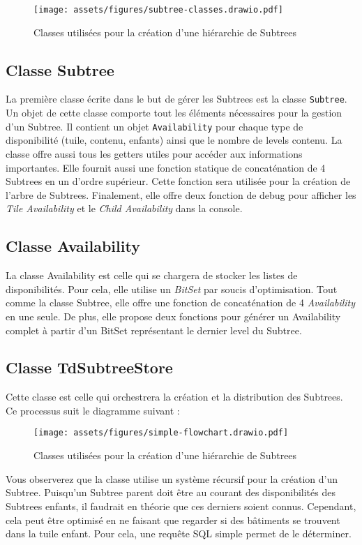 \begin{figure}[H]
    \centering
    \texttt{[image: assets/figures/subtree-classes.drawio.pdf]}
    \caption{Classes utilisées pour la création d'une hiérarchie de Subtrees}
    \label{fig:subtree-classes}
\end{figure}

\subsection*{Classe Subtree}
\label{sec:subtree-class}

La première classe écrite dans le but de gérer les Subtrees est la classe \texttt{Subtree}. Un objet de cette classe comporte tout les éléments nécessaires pour la gestion d'un Subtree. Il contient un objet \texttt{Availability} pour chaque type de disponibilité (tuile, contenu, enfants) ainsi que le nombre de levels contenu. La classe offre aussi tous les getters utiles pour accéder aux informations importantes. Elle fournit aussi une fonction statique de concaténation de 4 Subtrees en un d'ordre supérieur. Cette fonction sera utilisée pour la création de l'arbre de Subtrees. Finalement, elle offre deux fonction de debug pour afficher les \textit{Tile Availability} et le \textit{Child Availability} dans la console.

\subsection*{Classe Availability}
\label{sec:availability-class}

La classe Availability est celle qui se chargera de stocker les listes de disponibilités. Pour cela, elle utilise un \textit{BitSet} par soucis d'optimisation. Tout comme la classe Subtree, elle offre une fonction de concaténation de 4 \textit{Availability} en une seule. De plus, elle propose deux fonctions pour générer un Availability complet à partir d'un BitSet représentant le dernier level du Subtree.

\subsection*{Classe TdSubtreeStore}
\label{sec:tdsubtreestore-class}

Cette classe est celle qui orchestrera la création et la distribution des Subtrees. Ce processus suit le diagramme suivant :

\begin{figure}[H]
    \centering
    \texttt{[image: assets/figures/simple-flowchart.drawio.pdf]}
    \caption{Classes utilisées pour la création d'une hiérarchie de Subtrees}
    \label{fig:ssimple-flowchart}
\end{figure}

Vous observerez que la classe utilise un système récursif pour la création d'un Subtree. Puisqu'un Subtree parent doit être au courant des disponibilités des Subtrees enfants, il faudrait en théorie que ces derniers soient connus. Cependant, cela peut être optimisé en ne faisant que regarder si des bâtiments se trouvent dans la tuile enfant. Pour cela, une requête SQL simple permet de le déterminer.
